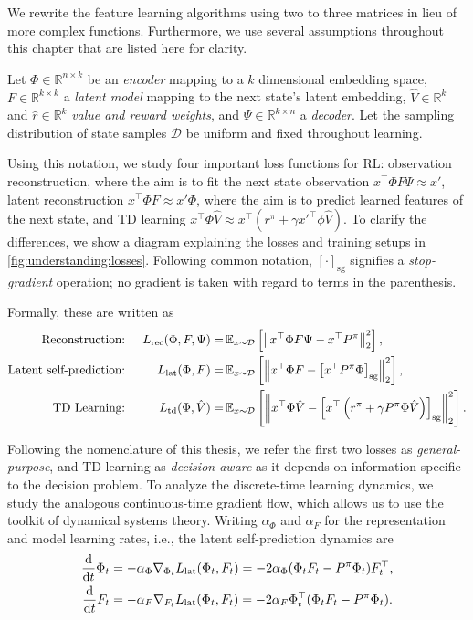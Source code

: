 We rewrite the feature learning algorithms using two to three matrices in lieu of more complex functions. Furthermore, we use several assumptions throughout this chapter that are listed here for clarity.

\begin{assumption}
\label{assumption:understanding:1}
Let $\Phi \in \mathbb{R}^{n \times k}$ be an \emph{encoder} mapping to a $k$ dimensional embedding space,
$F \in \mathbb{R}^{k\times k}$ a \emph{latent model} mapping to the next state's latent embedding, $\hat{V} \in \mathbb{R}^{k}$ and $\hat{r} \in \mathbb{R}^{k}$ \emph{value and reward weights}, and $\Psi \in \mathbb{R}^{k \times n}$ a \emph{decoder}.
Let the sampling distribution of state samples $\mathcal{D}$ be uniform and fixed throughout learning.
\end{assumption}

Using this notation, we study four important loss functions for RL: observation reconstruction, where the aim is to fit the next state observation $x^\top \Phi F \Psi \approx x'$, latent reconstruction $x^\top \Phi F \approx x' \Phi$, where the aim is to predict learned features of the next state, and TD learning $x^\top \Phi \hat{V} \approx x^\top(r^\pi + \gamma x'^\top\phi \hat{V})$. To clarify the differences, we show a diagram explaining the losses and training setups in \autoref{fig:understanding:losses}.
Following common notation, $[\cdot]_\mathrm{sg}$ signifies a \emph{stop-gradient} operation; no gradient is taken with regard to terms in the parenthesis.

Formally, these are written as
\begin{align*}
    \text{Reconstruction: }&& L_{\text{rec}}(\Phi,F,\Psi) =& \,\mathbb{E}_{x \sim \mathcal{D}}\left[  \left\lVert x^\top \Phi F \Psi - x^\top {P^\pi} \right\rVert_2^2 \right],\\
    \text{Latent self-prediction: }&& L_{\text{lat}}(\Phi,F) =& \,\mathbb{E}_{x \sim \mathcal{D}}\left[  \left\lVert x^\top \Phi F - \left[x^\top {P^\pi} \Phi\right]_{\mathrm{sg}} \right\rVert_2^2 \right], \\
    \text{TD Learning: }&& L_{\text{td}}(\Phi,\hat{V}) =& \,\mathbb{E}_{x \sim \mathcal{D}}\left[  \left\lVert x^\top \Phi \hat{V} - \left[x^\top  \left(r^\pi + \gamma P^\pi \Phi \hat{V}\right)\right]_{\mathrm{sg}} \right\rVert_2^2 \right].
\end{align*}

Following the nomenclature of this thesis, we refer the first two losses as \emph{general-purpose}, and TD-learning as \emph{decision-aware} as it depends on information specific to the decision problem.
To analyze the discrete-time learning dynamics, we study the analogous continuous-time gradient flow, which allows us to use the toolkit of dynamical systems theory.
Writing $\alpha_\Phi$ and $\alpha_F$ for the representation and model learning rates, i.e., the latent self-prediction dynamics are
\begin{align*}
    \frac{\mathrm{d}}{\mathrm{d} t} \Phi_t &= -\alpha_\Phi\nabla_{\Phi_t} {L}_{\text{lat}}(\Phi_t, F_t) = -2 \alpha_\Phi (\Phi_t F_t - P^\pi \Phi_t)  F_t^\top,\\
    \frac{\mathrm{d}}{\mathrm{d} t} F_t  &= -\alpha_F\nabla_{F_t} {L}_{\text{lat}}(\Phi_t, F_t) = -2 \alpha_F \Phi_t^\top(\Phi_t F_t - P^\pi \Phi_t).
\end{align*}

